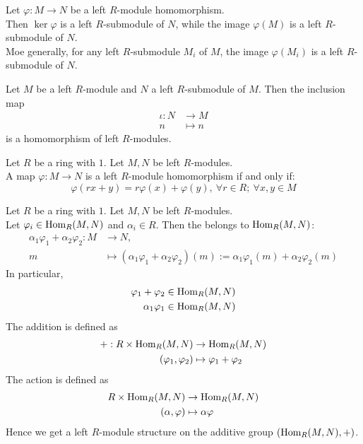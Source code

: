 \begin{remark}
Let $\varphi: M \rightarrow N$ be a left $R$-module homomorphism.\\
Then $\ker \varphi$ is a left $R$-submodule of $N$, while the image $\varphi(M)$ is a left $R$-submodule of $N$.\\
Moe generally, for any left $R$-submodule $M_i$ of $M$, the image $\varphi(M_i)$ is a left $R$-submodule of $N$.
\end{remark}

\begin{example}
Let $M$ be a left $R$-module and $N$ a left $R$-submodule of $M$. Then the inclusion map
\begin{align}
\iota: N &\rightarrow M \nonumber \\
n &\mapsto n \nonumber
\end{align}
is a homomorphism of left $R$-modules.
\end{example}

\begin{proposition}
Let $R$ be a ring with $1$. Let $M, N$ be left $R$-modules.\\
A map $\varphi: M \rightarrow N$ is a left $R$-module homomorphism if and only if:
\begin{equation}
\varphi(rx+y) = r\varphi(x) + \varphi(y), \ \forall r \in R; \ \forall x, y \in M \nonumber
\end{equation}
\end{proposition}

\begin{proposition}
Let $R$ be a ring with $1$. Let $M, N$ be left $R$-modules.\\
Let $\varphi_i \in \textnormal{Hom}_R(M,N)$ and $\alpha_i \in R$. Then the  belongs to $\textnormal{Hom}_R(M,N)$:
\begin{align}
\alpha_1 \varphi_1 + \alpha_2 \varphi_2: M &\rightarrow N, \nonumber \\
m &\mapsto (\alpha_1 \varphi_1 + \alpha_2 \varphi_2)(m) := \alpha_1 \varphi_1(m) + \alpha_2 \varphi_2(m) \nonumber
\end{align}
In particular, 
\begin{align}
\varphi_1 + \varphi_2 &\in \textnormal{Hom}_R(M,N) \nonumber \\
\alpha_1 \varphi_1 &\in \textnormal{Hom}_R(M,N) \nonumber
\end{align}
The addition is defined as
\begin{align}
+ : R \times \textnormal{Hom}_R(M,N) &\rightarrow \textnormal{Hom}_R(M,N) \nonumber \\
(\varphi_1, \varphi_2) &\mapsto \varphi_1 + \varphi_2 \nonumber
\end{align}
The action is defined as
\begin{align}
R \times \textnormal{Hom}_R(M,N) &\rightarrow \textnormal{Hom}_R(M,N) \nonumber \\
(\alpha, \varphi) &\mapsto \alpha \varphi \nonumber
\end{align}
Hence we get a left $R$-module structure on the additive group $(\textnormal{Hom}_R(M,N), +)$.
\end{proposition}

